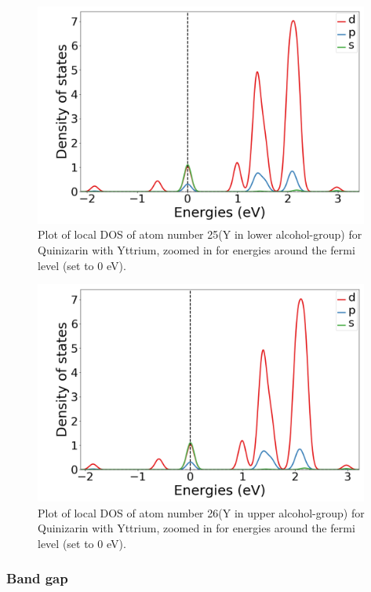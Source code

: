 \documentclass{article}
\begin{document}
      \begin{figure}[H]
        \centering
        \includegraphics[width = 11cm]{../fig/Y_LDOS25_2.png}
        \caption{Plot of local DOS of atom number 25(Y in lower alcohol-group) for Quinizarin with Yttrium, zoomed in for energies around the fermi level (set to 0 eV). }
        \label{fig:Y_LDOS25_2}
      \end{figure}

      \begin{figure}[H]
          \centering
          \includegraphics[width = 11cm]{../fig/Y_LDOS26_2.png}
          \caption{Plot of local DOS of atom number 26(Y in upper alcohol-group) for Quinizarin with Yttrium, zoomed in for energies around the fermi level (set to 0 eV). }
          \label{fig:Y_LDOS26_2}
      \end{figure}

      \vspace{1cm}

    \subsubsection{Band gap}
\end{document}

